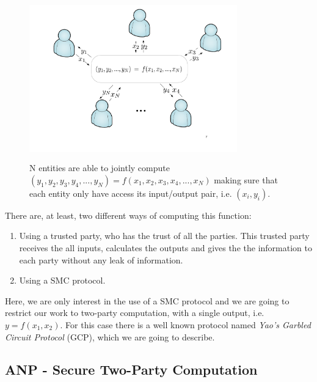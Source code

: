 \begin{refsection}
\begin{figure}[H]\label{fig:smcN}
	\centering
	\includegraphics[width=9cm, height=7cm]{./sdf/secure_multiparty_computation/figures/smc_N.pdf}
    \caption{N entities are able to jointly compute $(y_1,y_2,y_3,y_4,...,y_N)=f(x_1,x_2,x_3,x_4,...,x_N)$ making sure that each entity only have access its input/output pair, i.e. $\left( x_i, y_i\right)$.}
\end{figure}

There are, at least, two different ways of computing this function:

\begin{enumerate}
  \item Using a trusted party, who has the trust of all the parties. This trusted party receives the all inputs, calculates the outputs and gives the the information to each party without any leak of information.
  \item Using a SMC protocol.
\end{enumerate}

Here, we are only interest in the use of a SMC protocol and we are going to restrict our work to two-party computation, with a single output, i.e. $y = f(x_1, x_2)$. For this case there is a well known protocol named \emph{Yao's Garbled Circuit Protocol} (GCP), which we are going to describe.

\subsection{ANP - Secure Two-Party Computation}


\end{refsection}
